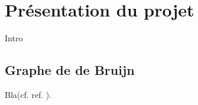 \chapter{Présentation du projet}

Intro\footnotemark\\

\section{Graphe de de Bruijn}


{}
Bla(cf. ref. \cite{cite6}).